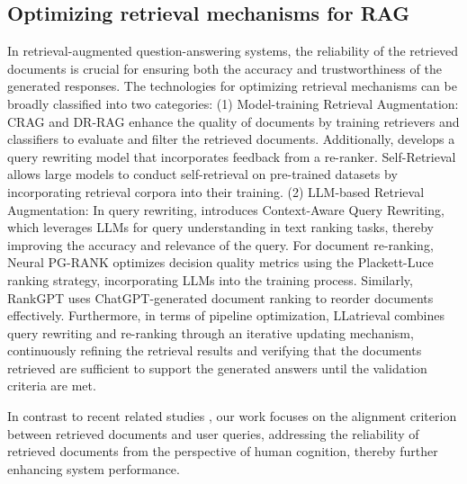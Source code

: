 \subsection{Optimizing retrieval mechanisms for RAG}
In retrieval-augmented question-answering systems, the reliability of the retrieved documents is crucial for ensuring both the accuracy and trustworthiness of the generated responses. The technologies for optimizing retrieval mechanisms can be broadly classified into two categories: (1) Model-training Retrieval Augmentation: CRAG \citep{ref31} and DR-RAG \citep{ref32} enhance the quality of documents by training retrievers and classifiers to evaluate and filter the retrieved documents. Additionally, \citet{ref33} develops a query rewriting model that incorporates feedback from a re-ranker. Self-Retrieval \citep{ref34} allows large models to conduct self-retrieval on pre-trained datasets by incorporating retrieval corpora into their training. (2) LLM-based Retrieval Augmentation: In query rewriting, \citet{ref41} introduces Context-Aware Query Rewriting, which leverages LLMs for query understanding in text ranking tasks, thereby improving the accuracy and relevance of the query. For document re-ranking, Neural PG-RANK \citep{ref43} optimizes decision quality metrics using the Plackett-Luce ranking strategy, incorporating LLMs into the training process. Similarly, RankGPT \citep{sun-etal-2023-chatgpt} uses ChatGPT-generated document ranking to reorder documents effectively. Furthermore, in terms of pipeline optimization, LLatrieval \citep{li-etal-2024-llatrieval} combines query rewriting and re-ranking through an iterative updating mechanism, continuously refining the retrieval results and verifying that the documents retrieved are sufficient to support the generated answers until the validation criteria are met.

In contrast to recent related studies \citep{ref31,sun-etal-2023-chatgpt,li-etal-2024-llatrieval}, our work focuses on the alignment criterion between retrieved documents and user queries, addressing the reliability of retrieved documents from the perspective of human cognition, thereby further enhancing system performance.